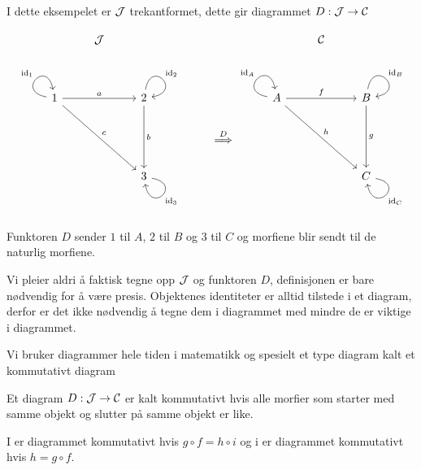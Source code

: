 \begin{eksempel}\label{ex:Diag2}
  I dette eksempelet er $\mathcal{J}$ trekantformet, dette gir
  diagrammet $D:\mathcal{J}\to\mathcal{C}$

  \[\begin{tikzcd}
	& \Jcal &&&&& \Ccal \\
	\\
	1 && 2 &&& A && B \\
	&&&& {\stackrel{D}{\implies}} \\
	&& 3 &&&&& C
	\arrow["{\id_1}", from=3-1, to=3-1, loop, in=100, out=170, distance=10mm]
	\arrow["a", from=3-1, to=3-3]
	\arrow["c", from=3-1, to=5-3]
	\arrow["{\id_2}", from=3-3, to=3-3, loop, in=10, out=80, distance=10mm]
	\arrow["b", from=3-3, to=5-3]
	\arrow["{\id_A}", from=3-6, to=3-6, loop, in=100, out=170, distance=10mm]
	\arrow["f", from=3-6, to=3-8]
	\arrow["h", from=3-6, to=5-8]
	\arrow["{\id_B}", from=3-8, to=3-8, loop, in=10, out=80, distance=10mm]
	\arrow["g", from=3-8, to=5-8]
	\arrow["{\id_3}", from=5-3, to=5-3, loop, in=280, out=350, distance=10mm]
	\arrow["{\id_C}", from=5-8, to=5-8, loop, in=280, out=350, distance=10mm]
\end{tikzcd}\]

Funktoren $D$ sender $1$ til $A$, $2$ til $B$ og $3$ til $C$ og
  morfiene blir sendt til de naturlig morfiene.
\end{eksempel}
Vi pleier aldri å faktisk tegne opp $\mathcal{J}$ og funktoren $D$,
definisjonen er bare nødvendig for å være presis. Objektenes
identiteter er alltid tilstede i et diagram, derfor er det ikke nødvendig
å tegne dem i diagrammet med mindre de er viktige i diagrammet.

Vi bruker diagrammer hele tiden i matematikk og spesielt et type
diagram kalt et kommutativt diagram

\begin{definisjon}\label{def:KomDiag}
Et diagram $D:\mathcal{J}\to\mathcal{C}$ er kalt kommutativt hvis alle morfier
som starter med samme objekt og slutter på samme objekt er like.
\end{definisjon}

I  er diagrammet kommutativt hvis $g\circ
f = h\circ i$ og i  er diagrammet
kommutativt hvis $h=g\circ f$.

